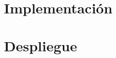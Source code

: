 \documentclass[openright,twoside,10pt]{book}
\begin{document}
\chapter{Implementación}\label{cap.implementation}


\chapter{Despliegue}\label{cap.deploy}



\appendix

%
%
\end{document}
